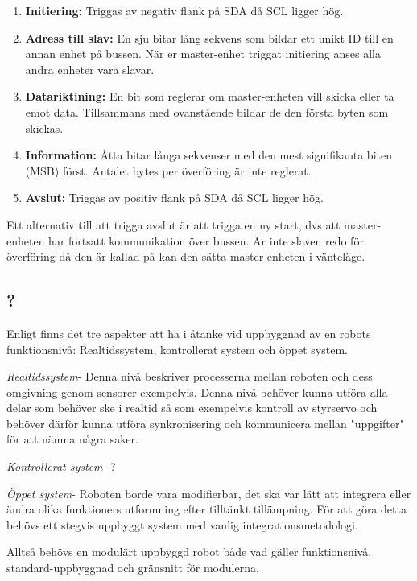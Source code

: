 \documentclass[11pt]{article}
\begin{document}
\begin{flushleft}
\begin{enumerate}
	\item \textbf{Initiering:} Triggas av negativ flank på SDA då SCL ligger hög.
	\item \textbf{Adress till slav:} En sju bitar lång sekvens som bildar ett unikt ID till en annan enhet på bussen. När er master-enhet triggat initiering anses alla andra enheter vara slavar.
	\item \textbf{Datariktining:} En bit som reglerar om master-enheten vill skicka eller ta emot data. Tillsammans med ovanstående bildar de den första byten som skickas.
	\item \textbf{Information:} Åtta bitar långa sekvenser med den mest signifikanta biten (MSB) först. Antalet bytes per överföring är inte reglerat.
	\item \textbf{Avslut:} Triggas av positiv flank på SDA då SCL ligger hög.
\end{enumerate}

Ett alternativ till att trigga avslut är att trigga en ny start, dvs att master-enheten har fortsatt kommunikation över bussen. Är inte slaven redo för överföring då den är kallad på kan den sätta master-enheten i vänteläge.

\subsection{?}
Enligt \cite{GenoM} finns det tre aspekter att ha i åtanke vid uppbyggnad av en robots funktionsnivå: Realtidssystem, kontrollerat system och öppet system. 

\textit{Realtidssystem}- Denna nivå beskriver processerna mellan roboten och dess omgivning genom sensorer exempelvis. Denna nivå behöver kunna utföra alla delar som behöver ske i realtid så som exempelvis kontroll av styrservo och behöver därför kunna utföra synkronisering och kommunicera mellan "uppgifter" för att nämna några saker. 

\textit{Kontrollerat system}- ?

\textit{Öppet system}- Roboten borde vara modifierbar, det ska var lätt att integrera eller ändra olika funktioners utformning efter tilltänkt tillämpning. För att göra detta behövs ett stegvis uppbyggt system med vanlig integrationsmetodologi. 

Alltså behövs en modulärt uppbyggd robot både vad gäller funktionsnivå, standard-uppbyggnad och gränsnitt för modulerna. 


\end{flushleft}
\end{document}
